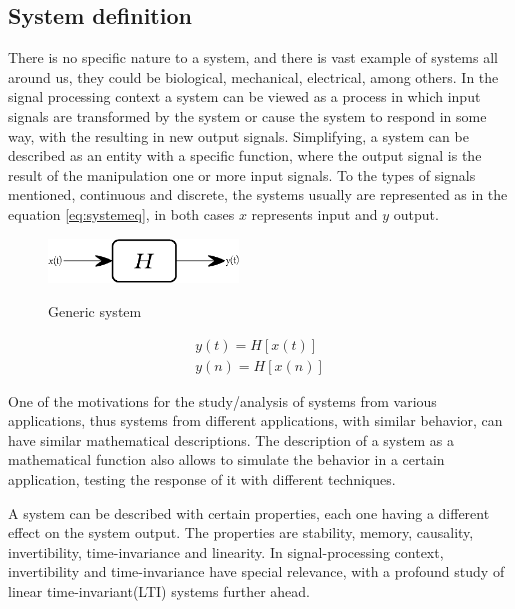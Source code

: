 \subsection{System definition}\label{subsec:SysDef}
There is no specific nature to a system, and there is vast example of systems all around us, they could be biological, mechanical, electrical, among others. In the signal processing context a system can be viewed as a process in which input signals are transformed by the system or cause the system to respond in some way, with the resulting in new output signals. Simplifying, a system can be described as an entity with a specific function, where the output signal is the result of the manipulation one or more input signals.
To the types of signals mentioned, continuous and discrete, the systems usually are represented as in the equation \ref{eq:systemeq}, in both cases $x$ represents input and $y$ output.
\begin{figure}[!htb]
    \centering
    \includegraphics[width=0.45\textwidth]{Chapters/2CHP/Diagrams/systemIll.eps}
    \caption{Generic system}{}    
    \label{fig:piezoresistiveacc}
\end{figure}
\begin{equation} \label{eq:systemeq}
    \begin{split}
        y(t) = H[x(t)] \\
        y(n) = H[x(n)]
    \end{split}
\end{equation}

One of the motivations for the study/analysis of systems from various applications, thus systems from different applications, with similar behavior, can have similar mathematical descriptions. The description of a system as a mathematical function also allows to simulate the behavior in a certain application, testing the response of it with different techniques. 

A system can be described with certain properties, each one having a different effect on the system output. The properties are stability, memory, causality, invertibility, time-invariance and linearity. In signal-processing context, invertibility and time-invariance have special relevance, with a profound study of linear time-invariant(LTI) systems further ahead\cite{oppenheimSignalsSystems1997}\cite{haykin1999signals}.
